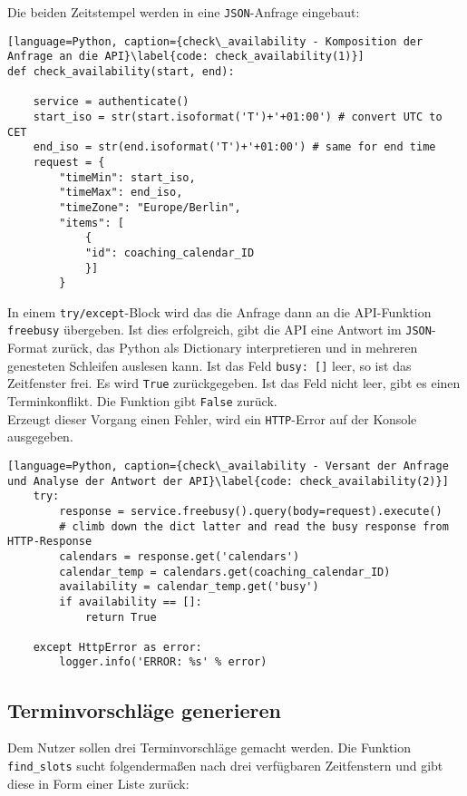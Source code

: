             Die beiden Zeitstempel werden in eine \verb|JSON|-Anfrage eingebaut:
            \begin{lstlisting}[language=Python, caption={check\_availability - Komposition der Anfrage an die API}\label{code: check_availability(1)}]
def check_availability(start, end):

    service = authenticate()
    start_iso = str(start.isoformat('T')+'+01:00') # convert UTC to CET
    end_iso = str(end.isoformat('T')+'+01:00') # same for end time
    request = {
        "timeMin": start_iso,
        "timeMax": end_iso,
        "timeZone": "Europe/Berlin", 
        "items": [
            {
            "id": coaching_calendar_ID
            }]
        }
            \end{lstlisting}

            In einem \verb|try/except|-Block wird das die Anfrage dann an die API-Funktion \verb|freebusy| übergeben. Ist dies erfolgreich, gibt die API eine Antwort im \verb|JSON|-Format zurück, das Python als Dictionary interpretieren und in mehreren genesteten Schleifen auslesen kann. Ist das Feld \verb|busy: []| leer, so ist das Zeitfenster frei. Es wird \verb|True| zurückgegeben. Ist das Feld nicht leer, gibt es einen Terminkonflikt. Die Funktion gibt \verb|False| zurück. \\
            Erzeugt dieser Vorgang einen Fehler, wird ein \verb|HTTP|-Error auf der Konsole ausgegeben. \\

            \begin{lstlisting}[language=Python, caption={check\_availability - Versant der Anfrage und Analyse der Antwort der API}\label{code: check_availability(2)}]
    try:
        response = service.freebusy().query(body=request).execute()    
        # climb down the dict latter and read the busy response from HTTP-Response
        calendars = response.get('calendars')
        calendar_temp = calendars.get(coaching_calendar_ID)
        availability = calendar_temp.get('busy')
        if availability == []:
            return True

    except HttpError as error:
        logger.info('ERROR: %s' % error)
                    \end{lstlisting}




        \subsection{Terminvorschläge generieren}
            Dem Nutzer sollen drei Terminvorschläge gemacht werden. Die Funktion \verb|find_slots| sucht folgendermaßen nach drei verfügbaren Zeitfenstern und gibt diese in Form einer Liste zurück: 
            

